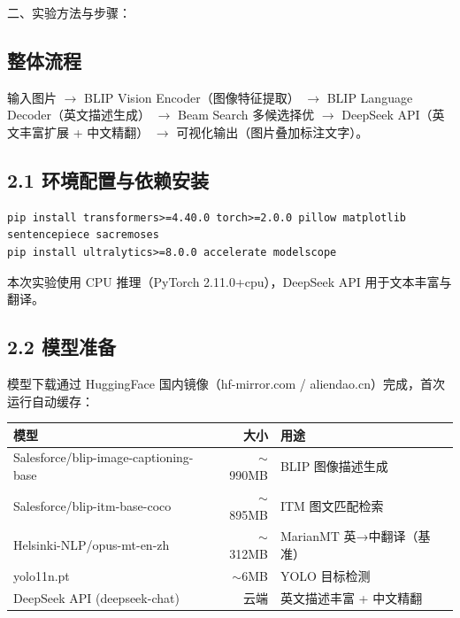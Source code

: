 \documentclass[12pt, a4paper]{article}
\begin{document}
\begin{labbox}{二、实验方法与步骤：}{}

\subsection*{整体流程}

\noindent 输入图片 $\rightarrow$ BLIP Vision Encoder（图像特征提取）
$\rightarrow$ BLIP Language Decoder（英文描述生成）
$\rightarrow$ Beam Search 多候选择优
$\rightarrow$ DeepSeek API（英文丰富扩展 + 中文精翻）
$\rightarrow$ 可视化输出（图片叠加标注文字）。

\subsection*{2.1 环境配置与依赖安装}

\begin{lstlisting}
pip install transformers>=4.40.0 torch>=2.0.0 pillow matplotlib sentencepiece sacremoses
pip install ultralytics>=8.0.0 accelerate modelscope
\end{lstlisting}

本次实验使用 CPU 推理（PyTorch 2.11.0+cpu），DeepSeek API 用于文本丰富与翻译。

\subsection*{2.2 模型准备}

模型下载通过 HuggingFace 国内镜像（hf-mirror.com / aliendao.cn）完成，首次运行自动缓存：

\begin{center}
\begin{tabular}{|l|r|l|}
    \hline
    \textbf{模型} & \textbf{大小} & \textbf{用途} \\
    \hline
    Salesforce/blip-image-captioning-base & $\sim$990MB & BLIP 图像描述生成 \\
    Salesforce/blip-itm-base-coco & $\sim$895MB & ITM 图文匹配检索 \\
    Helsinki-NLP/opus-mt-en-zh & $\sim$312MB & MarianMT 英→中翻译（基准） \\
    yolo11n.pt & $\sim$6MB & YOLO 目标检测 \\
    DeepSeek API (deepseek-chat) & 云端 & 英文描述丰富 + 中文精翻 \\
    \hline
\end{tabular}
\end{center}


\end{labbox}
\end{document}
